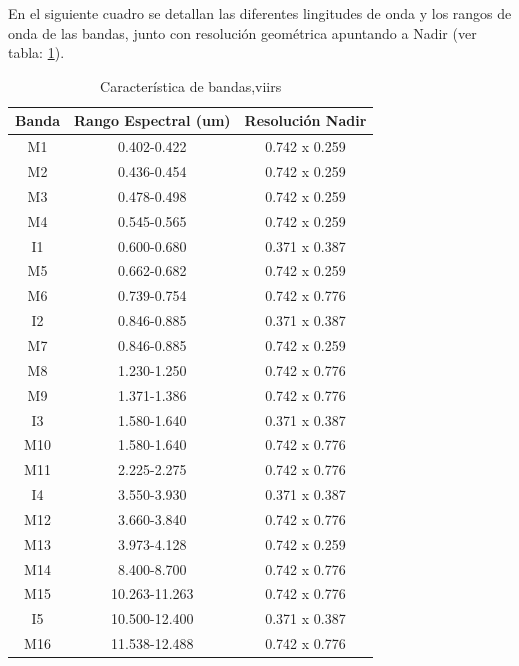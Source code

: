En el siguiente cuadro se detallan las diferentes lingitudes de onda y los rangos de onda de las bandas, junto con resolución geométrica apuntando a Nadir (ver tabla: \ref{tab:viirs}).
\begin{table}[H]
\begin{center}
\begin{tabular}{|c|c|c|}
\hline Banda & Rango Espectral (um) & Resolución Nadir \\\hline 
 		M1  & 0.402-0.422   & 0.742 x 0.259 \\ \hline 
		M2  & 0.436-0.454   & 0.742 x 0.259 \\ \hline 
		M3  & 0.478-0.498   & 0.742 x 0.259 \\ \hline 
		M4  & 0.545-0.565   & 0.742 x 0.259 \\ \hline 
		I1  & 0.600-0.680   & 0.371 x 0.387 \\ \hline 
		M5  & 0.662-0.682   & 0.742 x 0.259 \\ \hline 
		M6  & 0.739-0.754   & 0.742 x 0.776 \\ \hline 
		I2  & 0.846-0.885   & 0.371 x 0.387 \\ \hline 
		M7  & 0.846-0.885   & 0.742 x 0.259 \\ \hline 
		M8  & 1.230-1.250   & 0.742 x 0.776 \\ \hline 
		M9  & 1.371-1.386   & 0.742 x 0.776 \\ \hline 
		I3  & 1.580-1.640   & 0.371 x 0.387 \\ \hline 
		M10 & 1.580-1.640   & 0.742 x 0.776 \\ \hline 
		M11 & 2.225-2.275   & 0.742 x 0.776 \\ \hline 
		I4  & 3.550-3.930   & 0.371 x 0.387 \\ \hline 
		M12 & 3.660-3.840   & 0.742 x 0.776 \\ \hline 
		M13 & 3.973-4.128   & 0.742 x 0.259 \\ \hline 
		M14 & 8.400-8.700   & 0.742 x 0.776 \\ \hline 
		M15 & 10.263-11.263 & 0.742 x 0.776 \\ \hline 
		I5  & 10.500-12.400 & 0.371 x 0.387 \\ \hline 
		M16 & 11.538-12.488 & 0.742 x 0.776 \\ \hline 
\end{tabular}
\end{center}\caption{Característica de bandas,\ac{viirs} \label{tab:viirs}}
\end{table}

